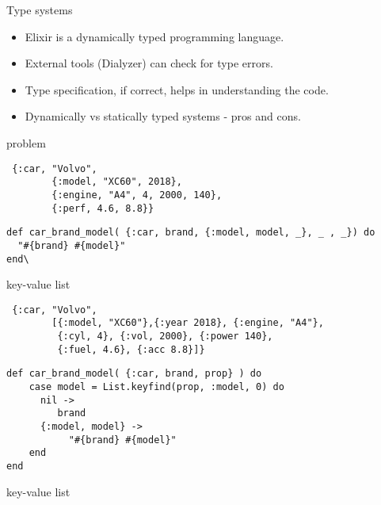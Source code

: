 \begin{frame}{Type systems}

\begin{itemize}
\item Elixir is a dynamically typed programming language. \pause
\item External tools (Dialyzer) can check for type errors.  \pause
\item Type specification, if correct, helps in understanding the code.  \pause
\item Dynamically vs statically typed systems - pros and cons.  \pause
\end{itemize}

\end{frame}

\begin{frame}[fragile]{problem}

\begin{verbatim}
 {:car, "Volvo", 
        {:model, "XC60", 2018}, 
        {:engine, "A4", 4, 2000, 140}, 
        {:perf, 4.6, 8.8}}
\end{verbatim}

\vspace{20pt} \pause
  
\begin{verbatim}
def car_brand_model( {:car, brand, {:model, model, _}, _ , _}) do 
  "#{brand} #{model}"
end\
\end{verbatim}
\end{frame}


\begin{frame}[fragile]{key-value list}

\begin{verbatim}
 {:car, "Volvo", 
        [{:model, "XC60"},{:year 2018}, {:engine, "A4"}, 
         {:cyl, 4}, {:vol, 2000}, {:power 140}, 
         {:fuel, 4.6}, {:acc 8.8}]}
\end{verbatim}
  
\vspace{20pt} \pause

\begin{verbatim}
def car_brand_model( {:car, brand, prop} ) do
    case model = List.keyfind(prop, :model, 0) do
      nil -> 
         brand
      {:model, model} ->
           "#{brand} #{model}"
    end
end
\end{verbatim}
\end{frame}

\begin{frame}[fragile]{key-value list}

\vspace{20pt}


\vspace{40pt}
  
\end{frame}


